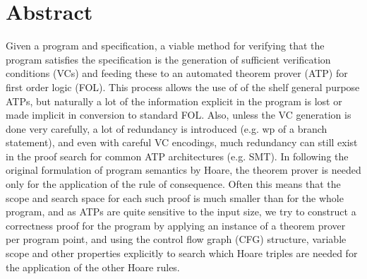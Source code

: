 \section{Abstract}

Given a program and specification, a viable method for verifying that the program satisfies the specification is the generation of sufficient verification conditions (VCs) and feeding these to an automated theorem prover (ATP) for first order logic (FOL).
This process allows the use of of the shelf general purpose ATPs, but naturally a lot of the information explicit in the program is lost or made implicit in conversion to standard FOL. Also, unless the VC generation is done very carefully, a lot of redundancy is introduced (e.g. wp of a branch statement), and even with careful VC encodings, much redundancy can still exist in the proof search for common ATP architectures (e.g. SMT).
In following the original formulation of program semantics by Hoare, the theorem prover is needed only for the application of the rule of consequence. 
Often this means that the scope and search space for each such proof is much smaller than for the whole program, and as ATPs are quite sensitive to the input size, we try to construct a correctness proof for the program by applying an instance of a theorem prover per program point, and using the control flow graph (CFG) structure, variable scope and other properties explicitly to search which Hoare triples are needed for the application of the other Hoare rules.

